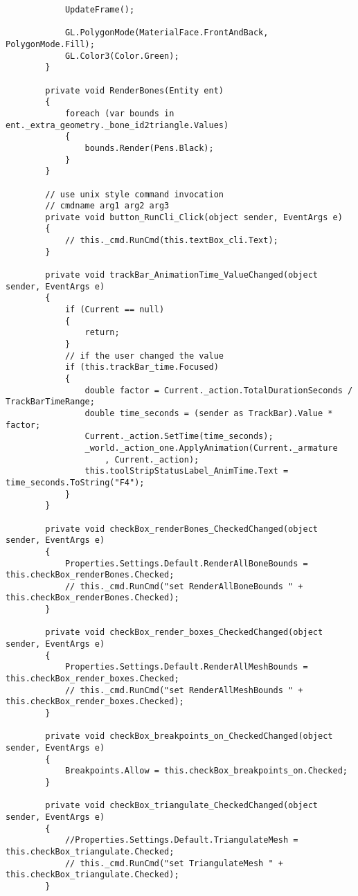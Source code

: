 \begin{scriptsize}
\begin{verbatim}
            UpdateFrame();

            GL.PolygonMode(MaterialFace.FrontAndBack, PolygonMode.Fill);
            GL.Color3(Color.Green);
        }

        private void RenderBones(Entity ent)
        {
            foreach (var bounds in ent._extra_geometry._bone_id2triangle.Values)
            {
                bounds.Render(Pens.Black);
            }
        }

        // use unix style command invocation
        // cmdname arg1 arg2 arg3
        private void button_RunCli_Click(object sender, EventArgs e)
        {
            // this._cmd.RunCmd(this.textBox_cli.Text);
        }

        private void trackBar_AnimationTime_ValueChanged(object sender, EventArgs e)
        {
            if (Current == null)
            {
                return;
            }
            // if the user changed the value
            if (this.trackBar_time.Focused)
            {
                double factor = Current._action.TotalDurationSeconds / TrackBarTimeRange;
                double time_seconds = (sender as TrackBar).Value * factor;
                Current._action.SetTime(time_seconds);
                _world._action_one.ApplyAnimation(Current._armature
                    , Current._action);
                this.toolStripStatusLabel_AnimTime.Text = time_seconds.ToString("F4");
            }
        }

        private void checkBox_renderBones_CheckedChanged(object sender, EventArgs e)
        {
            Properties.Settings.Default.RenderAllBoneBounds = this.checkBox_renderBones.Checked;
            // this._cmd.RunCmd("set RenderAllBoneBounds " + this.checkBox_renderBones.Checked);
        }

        private void checkBox_render_boxes_CheckedChanged(object sender, EventArgs e)
        {
            Properties.Settings.Default.RenderAllMeshBounds = this.checkBox_render_boxes.Checked;
            // this._cmd.RunCmd("set RenderAllMeshBounds " + this.checkBox_render_boxes.Checked);
        }

        private void checkBox_breakpoints_on_CheckedChanged(object sender, EventArgs e)
        {
            Breakpoints.Allow = this.checkBox_breakpoints_on.Checked;
        }

        private void checkBox_triangulate_CheckedChanged(object sender, EventArgs e)
        {
            //Properties.Settings.Default.TriangulateMesh = this.checkBox_triangulate.Checked;
            // this._cmd.RunCmd("set TriangulateMesh " + this.checkBox_triangulate.Checked);
        }


\end{verbatim}
\end{scriptsize}
